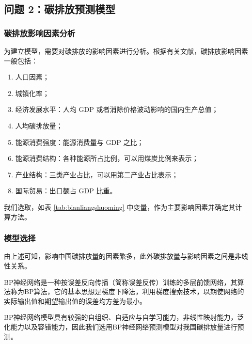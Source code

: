 \subsection{问题 2：碳排放预测模型}

  \subsubsection{碳排放影响因素分析}
    为建立模型，需要对碳排放的影响因素进行分析。根据有关文献，碳排放影响因素一般包括：
    \begin{enumerate}
      \item 人口因素；
      \item 城镇化率；
      \item 经济发展水平：人均 $\mathrm{GDP}$ 或者消除价格波动影响的国内生产总值；
      \item 人均碳排放量；
      \item 能源消费强度：能源消费量与 $\mathrm{GDP}$ 之比；
      \item 能源消费结构：各种能源所占比例，可以用煤炭比例来表示；
      \item 产业结构：三类产业占比，可以用第二产业占比表示；
      \item 国际贸易：出口额占 $\mathrm{GDP}$ 比重。
    \end{enumerate}
    我们选取，如表 \ref{tab:bianliangshuoming} 中变量，作为主要影响因素并确定其计算方法。

  \subsubsection{模型选择}
    由上述可知，影响中国碳排放量的因素繁多，此外碳排放量与影响因素之间是非线性关系。

    BP神经网络是一种按误差反向传播（简称误差反传）训练的多层前馈网络，其算法称为BP算法，它的基本思想是梯度下降法，利用梯度搜索技术，以期使网络的实际输出值和期望输出值的误差均方差为最小。

    BP神经网络模型具有较强的自组织、自适应与自学习能力，非线性映射能力，泛化能力以及容错能力，因此我们选用BP神经网络预测模型对我国碳排放量进行预测。

